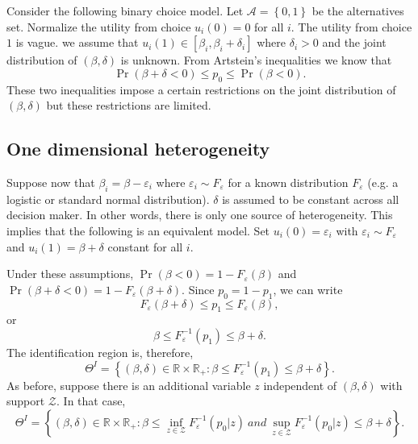 \documentclass[reqno]{article}
\begin{document}
Consider the following binary choice model. Let $\mathcal{A}=\left\{
0,1\right\} $ be the alternatives set. Normalize the utility from choice $%
u_{i}\left( 0\right) =0$ for all $i$. The utility from choice $1$ is vague.
we assume that $u_{i}\left( 1\right) \in \left[ \beta _{i},\beta _{i}+\delta
_{i}\right] $ where $\delta _{i}>0$ and the joint distribution of $\left(
\beta ,\delta \right) $ is unknown. From Artstein's inequalities we know that%
\begin{equation*}
\Pr \left( \beta +\delta <0\right) \leq p_{0}\leq \Pr \left( \beta <0\right)
.
\end{equation*}%
These two inequalities impose a certain restrictions on the joint
distribution of $\left( \beta ,\delta \right) $ but these restrictions are
limited.

\subsection{One dimensional heterogeneity}

Suppose now that $\beta _{i}=\beta -\varepsilon _{i}$ where $\varepsilon
_{i}\sim F_{\varepsilon }$ for a known distribution $F_{\varepsilon }$ (e.g.
a logistic or standard normal distribution). $\delta $ is assumed to be
constant across all decision maker. In other words, there is only one source
of heterogeneity. This implies that the following is an equivalent model.
Set $u_{i}\left( 0\right) =\varepsilon _{i}$ with $\varepsilon _{i}\sim
F_{\varepsilon }$ and $u_{i}\left( 1\right) =\beta +\delta $ constant for
all $i$.

Under these assumptions, $\Pr \left( \beta <0\right) =1-F_{\varepsilon
}\left( \beta \right) $ and $\Pr \left( \beta +\delta <0\right)
=1-F_{\varepsilon }\left( \beta +\delta \right) $. Since $p_{0}=1-p_{1}$, we
can write 
\begin{equation*}
F_{\varepsilon }\left( \beta +\delta \right) \leq p_{1}\leq F_{\varepsilon
}\left( \beta \right) ,
\end{equation*}%
or%
\begin{equation*}
\beta \leq F_{\varepsilon }^{-1}\left( p_{1}\right) \leq \beta +\delta .
\end{equation*}%
The identification region is, therefore, 
\begin{equation*}
\Theta ^{I}=\left\{ \left( \beta ,\delta \right) \in \mathbb{R} \times \mathbb{R}_{+}:\beta \leq F_{\varepsilon }^{-1}\left( p_{1}\right) \leq \beta +\delta
\right\} .
\end{equation*}%
As before, suppose there is an additional variable $z$ independent of $%
\left( \beta ,\delta \right) $ with support $\mathcal{Z}$. In that case,%
\begin{equation*}
\Theta ^{I}=\left\{ \left( \beta ,\delta \right) \in \mathbb{R} \times \mathbb{R}_{+}:\beta \leq \inf_{z\in \mathcal{Z}}F_{\varepsilon }^{-1}\left(
p_{0}|z\right) \ and\ \sup_{z\in \mathcal{Z}}F_{\varepsilon }^{-1}\left(
p_{0}|z\right) \leq \beta +\delta \right\} .
\end{equation*}
\end{document}
